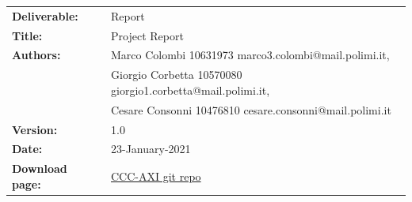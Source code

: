 \begin{table}[h!]
\begin{tabu} to \textwidth { X[0.3,r,p] X[0.7,l,p] }
\hline

\textbf{Deliverable:} & Report\\
\textbf{Title:} & Project Report \\
\textbf{Authors:}
   & Marco Colombi  10631973 marco3.colombi@mail.polimi.it,
\\ & Giorgio Corbetta 10570080 giorgio1.corbetta@mail.polimi.it,
\\ & Cesare Consonni 10476810 cesare.consonni@mail.polimi.it \\
\textbf{Version:} & 1.0 \\
\textbf{Date:} & 23-January-2021 \\
\textbf{Download page:} & \href{https://github.com/CesareConsonni/ES_20-21-CCC}{CCC-AXI git repo} \\
\hline
\end{tabu}
\end{table}




\setcounter{page}{2}


\newpage
{}
\tableofcontents
\newpage

\clearpage
{}
\label{sect:introduction}


\clearpage
{}
\label{sect:design}


\clearpage
{}
\label{sect:uart}


